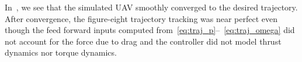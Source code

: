 In~, we see that the simulated UAV smoothly converged to the
desired trajectory.
After convergence,
the figure-eight trajectory
tracking was near perfect even though the feed forward inputs computed
from~\eqref{eq:traj_p}{}--{}~\eqref{eq:traj_omega} did not account for the force due to drag and
the controller did not model thrust dynamics nor torque dynamics.

